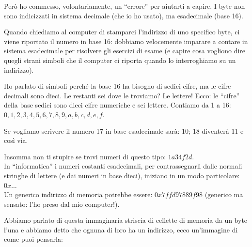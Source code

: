 	Però ho commesso, volontariamente, un ``errore'' per aiutarti a capire. I byte non sono indicizzati in sistema decimale (che io ho usato), ma esadecimale (base 16). 
	
	Quando chiediamo al computer di stamparci l'indirizzo di uno specifico byte, ci viene riportato il numero in base 16: dobbiamo velocemente imparare a contare in sistema esadecimale per risolvere gli esercizi di esame (e capire cosa vogliono dire quegli strani simboli che il computer ci riporta quando lo interroghiamo su un indirizzo).
	
	Ho parlato di simboli perché la base 16 ha bisogno di sedici cifre, ma le cifre decimali sono dieci. Le restanti sei dove le troviamo? Le lettere! Ecco: le ``cifre'' della base sedici sono dieci cifre numeriche e sei lettere. Contiamo da 1 a 16: $0, 1, 2, 3, 4, 5, 6, 7, 8, 9, a, b, c, d, e ,f$.
	
	Se vogliamo scrivere il numero 17 in base esadecimale sarà: 10; 18 diventerà 11 e così via. 
	
	Insomma non ti stupire se trovi numeri di questo tipo: $1a34f2d$. \\
	
	In ``informatica'' i numeri costanti esadecimali,  per contrassegnarli dalle normali stringhe di lettere (e dai numeri in base dieci), iniziano in un modo particolare: $0x\ldots$\\
	Un generico indirizzo di memoria potrebbe essere: $0x7ffd97889f98$ (generico ma sensato: l'ho preso dal mio computer!).

	Abbiamo parlato di questa immaginaria striscia di cellette di memoria da un byte l'una e abbiamo detto che ognuna di loro ha un indirizzo, ecco un'immagine di come puoi pensarla:
	
